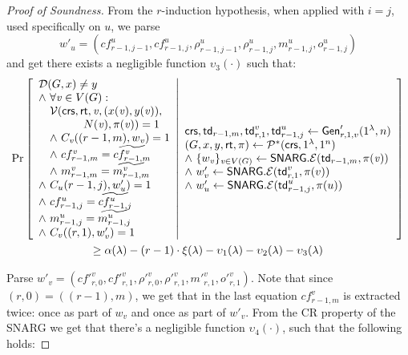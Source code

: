 \begin{proof}[Proof of Soundness]
From the $r$-induction hypothesis, when applied with $i=j$, used specifically on $u$, we parse $$w'_{u} = (cf^{u}_{r-1,j-1}, cf^{u}_{r-1,j}, \rho^{u}_{r-1,j-1}, \rho^{u}_{r-1,j}, m^{u}_{r-1,j}, o^{u}_{r-1,j})$$ and get there exists a negligible function $\upsilon_3(\cdot)$ such that:
\begin{gather*}
    \Pr \left[ \begin{array}{ll} 
    \mathcal{D}(G, x)\neq y  \\
    \wedge\ \forall \mathit{ v }\in V(G) : \\
    \quad \mathcal{V}(\mathsf{crs}, \mathsf{rt}, \mathit{ v }, (x(\mathit{ v }), y(\mathit{ v })),\\
    \qquad \qquad N(\mathit{ v }), \pi(\mathit{ v })) = 1 \\
    \quad \wedge ~C_{\mathit{ v }}((r-1, m), w_{\mathit{ v }}) = 1 \\
    \quad \wedge ~cf^{\mathit{ v }}_{r-1, m} = \widetilde{cf^{\mathit{ v }}_{r-1,m}} \\
    \quad \wedge ~m^{\mathit{ v }}_{r-1,m} = \widetilde{m^{\mathit{ v }}_{r-1,m}} \\
    \wedge ~C_{u}(r-1,j),w'_{u}) = 1 \\
    \wedge ~cf^u_{r-1,j} = \widetilde{cf^u_{r-1,j}} \\
    \wedge ~m^u_{r-1,j} = \widetilde{m^u_{r-1,j}} \\
    \wedge ~C_v((r,1),w'_v) = 1 
     \end{array} \middle\vert \begin{array}{ll} 
    \mathsf{crs}, \mathsf{td}_{r-1,m}, \mathsf{td}^v_{r,1}, \mathsf{td}^{u}_{r-1, j}\leftarrow \mathsf{Gen}'_{r,1,v}(1^\lambda, n) \\
    (G, x, y, \mathsf{rt}, \pi) \leftarrow \mathcal{P}^*(\mathsf{crs}, 1^\lambda, 1^n)\\
    \wedge ~\{w_{\mathit{ v }}\}_{\mathit{ v }\in V(G)}\leftarrow \mathsf{SNARG}.\mathcal{E}(\mathsf{td}_{r-1,m}, \pi(\mathit{ v })) \\
    \wedge ~w'_v\leftarrow \mathsf{SNARG}.\mathcal{E}(\mathsf{td}^v_{r,1}, \pi(v)) \\
    \wedge ~w'_{u}\leftarrow \mathsf{SNARG}.\mathcal{E}(\mathsf{td}^{u}_{r-1,j}, \pi(u))
     \end{array} \right]\\
    \geq \alpha(\lambda) - (r-1)\cdot\xi(\lambda) - \upsilon_1(\lambda) - \upsilon_2(\lambda) - \upsilon_3(\lambda)
\end{gather*}

Parse $w'_v = (cf'^v_{r,0}, cf'^v_{r,1}, \rho'^v_{r,0}, \rho'^v_{r,1}, m'^v_{r,1}, o'^v_{r,1})$. Note that since $(r,0) = ((r-1),m)$, we get that in the last equation $cf^v_{r-1,m}$ is extracted twice: once as part of $w_v$ and once as part of $w'_v$. From the CR property of the SNARG we get that there's a negligible function $\upsilon_4(\cdot)$, such that the following holds:


\end{proof}
